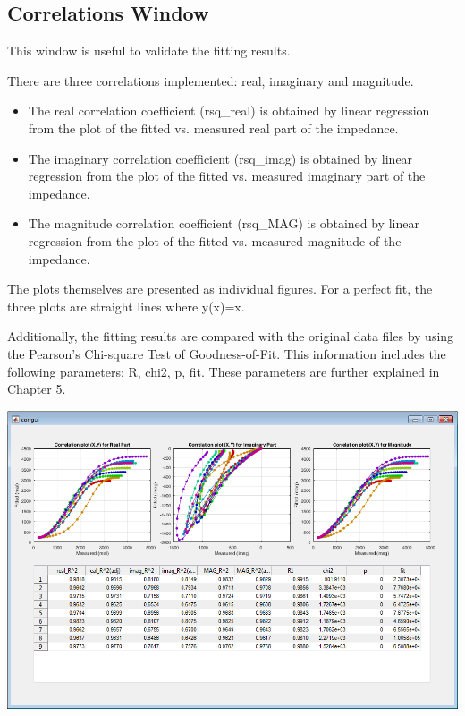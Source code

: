 \documentclass[9pt,a4paper,oneside]{book}
\begin{document}
\subsection{Correlations Window}

This window is useful to validate the fitting results. 

There are three correlations implemented: real, imaginary and magnitude. 

\begin{itemize}
\item The real correlation coefficient (rsq\_real) is obtained by linear regression from the plot of the fitted vs. measured real part of the impedance. 
\item The imaginary correlation coefficient (rsq\_imag) is obtained by linear regression from the plot of the fitted vs. measured imaginary part of the impedance.
\item The magnitude correlation coefficient (rsq\_MAG) is obtained by linear regression from the plot of the fitted vs. measured magnitude of the impedance.	
\end{itemize}

The plots themselves are presented as individual figures. For a perfect fit, the three plots are straight lines where y(x)=x.

Additionally, the fitting results are compared with the original data files by using the Pearson's Chi-square Test of Goodness-of-Fit. This information includes the following parameters: R, chi2, p, fit. These parameters are further explained in Chapter 5.

\includegraphics[width=15cm]{correlations.png}
\end{document}
